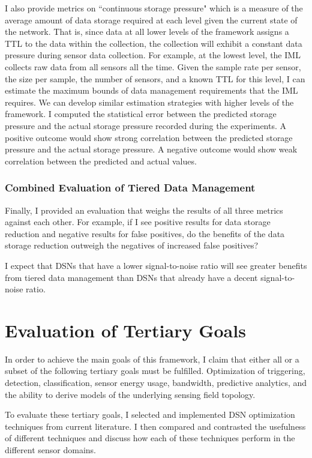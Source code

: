 I also provide metrics on ``continuous storage pressure" which is a measure of the average amount of data storage required at each level given the current state of the network. That is, since data at all lower levels of the framework assigns a TTL to the data within the collection, the collection will exhibit a constant data pressure during sensor data collection. For example, at the lowest level, the IML collects raw data from all sensors all the time. Given the sample rate per sensor, the size per sample, the number of sensors, and a known TTL for this level, I can estimate the maximum bounds of data management requirements that the IML requires. We can develop similar estimation strategies with higher levels of the framework. I computed the statistical error between the predicted storage pressure and the actual storage pressure recorded during the experiments. A positive outcome would show strong correlation between the predicted storage pressure and the actual storage pressure. A negative outcome would show weak correlation between the predicted and actual values.

\subsubsection{Combined Evaluation of Tiered Data Management}
Finally, I provided an evaluation that weighs the results of all three metrics against each other. For example, if I see positive results for data storage reduction and negative results for false positives, do the benefits of the data storage reduction outweigh the negatives of increased false positives?

I expect that DSNs that have a lower signal-to-noise ratio will see greater benefits from tiered data management than DSNs that already have a decent signal-to-noise ratio.

\section{Evaluation of Tertiary Goals}\label{sec:evaluation-of-tertiary-goals}
In order to achieve the main goals of this framework, I claim that either all or a subset of the following tertiary goals must be fulfilled. Optimization of triggering, detection, classification, sensor energy usage, bandwidth, predictive analytics, and the ability to derive models of the underlying sensing field topology.

To evaluate these tertiary goals, I selected and implemented DSN optimization techniques from current literature. I then compared and contrasted the usefulness of different techniques and discuss how each of these techniques perform in the different sensor domains.

